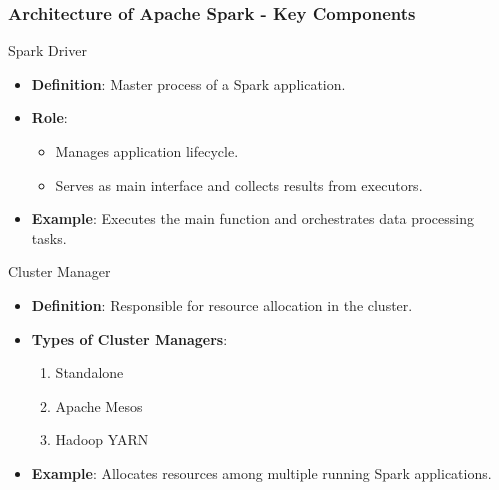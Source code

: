 \documentclass[aspectratio=169]{beamer}
\begin{document}
\begin{frame}[fragile]
    \frametitle{Architecture of Apache Spark - Key Components}
    \begin{block}{Spark Driver}
        \begin{itemize}
            \item \textbf{Definition}: Master process of a Spark application.
            \item \textbf{Role}:
                \begin{itemize}
                    \item Manages application lifecycle.
                    \item Serves as main interface and collects results from executors.
                \end{itemize}
            \item \textbf{Example}: Executes the main function and orchestrates data processing tasks.
        \end{itemize}
    \end{block}
    
    \begin{block}{Cluster Manager}
        \begin{itemize}
            \item \textbf{Definition}: Responsible for resource allocation in the cluster.
            \item \textbf{Types of Cluster Managers}:
                \begin{enumerate}
                    \item Standalone
                    \item Apache Mesos
                    \item Hadoop YARN
                \end{enumerate}
            \item \textbf{Example}: Allocates resources among multiple running Spark applications.
        \end{itemize}
    \end{block}
\end{frame}
\end{document}
